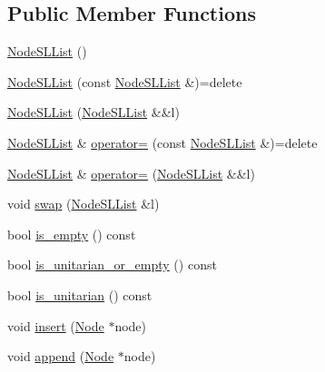 \subsection*{Public Member Functions}
\begin{DoxyCompactItemize}
\item 
\hyperlink{class_designar_1_1_node_s_l_list_a110541373e8c54e124136d6c82861e6b}{Node\+S\+L\+List} ()
\item 
\hyperlink{class_designar_1_1_node_s_l_list_af304750ff400323ae47d280a4646f2dc}{Node\+S\+L\+List} (const \hyperlink{class_designar_1_1_node_s_l_list}{Node\+S\+L\+List} \&)=delete
\item 
\hyperlink{class_designar_1_1_node_s_l_list_a89bc16ab51fd2e30a80d59e189ed194c}{Node\+S\+L\+List} (\hyperlink{class_designar_1_1_node_s_l_list}{Node\+S\+L\+List} \&\&l)
\item 
\hyperlink{class_designar_1_1_node_s_l_list}{Node\+S\+L\+List} \& \hyperlink{class_designar_1_1_node_s_l_list_a31a9e8aea9795ba5c2bf4f146f8cfe57}{operator=} (const \hyperlink{class_designar_1_1_node_s_l_list}{Node\+S\+L\+List} \&)=delete
\item 
\hyperlink{class_designar_1_1_node_s_l_list}{Node\+S\+L\+List} \& \hyperlink{class_designar_1_1_node_s_l_list_a1b35741a071a185842be3604b44fc003}{operator=} (\hyperlink{class_designar_1_1_node_s_l_list}{Node\+S\+L\+List} \&\&l)
\item 
void \hyperlink{class_designar_1_1_node_s_l_list_a4913c5234738bd3cb054785c25839420}{swap} (\hyperlink{class_designar_1_1_node_s_l_list}{Node\+S\+L\+List} \&l)
\item 
bool \hyperlink{class_designar_1_1_node_s_l_list_a08193f474acd49c5dd135abc529f934f}{is\+\_\+empty} () const
\item 
bool \hyperlink{class_designar_1_1_node_s_l_list_a82d5d8f34935b87b9032b5dcdf2caea0}{is\+\_\+unitarian\+\_\+or\+\_\+empty} () const
\item 
bool \hyperlink{class_designar_1_1_node_s_l_list_a1d0b560b0f1bfc9a40eb405d0cc22a59}{is\+\_\+unitarian} () const
\item 
void \hyperlink{class_designar_1_1_node_s_l_list_aa6b522a7d687f39959d93ebc80903261}{insert} (\hyperlink{class_designar_1_1_node_s_l_list_a41963019ada1025099e3259207a3de96}{Node} $\ast$node)
\item 
void \hyperlink{class_designar_1_1_node_s_l_list_a292f57c43bc8c2521e2865f5d431ccf6}{append} (\hyperlink{class_designar_1_1_node_s_l_list_a41963019ada1025099e3259207a3de96}{Node} $\ast$node)
\item 

\end{DoxyCompactItemize}
